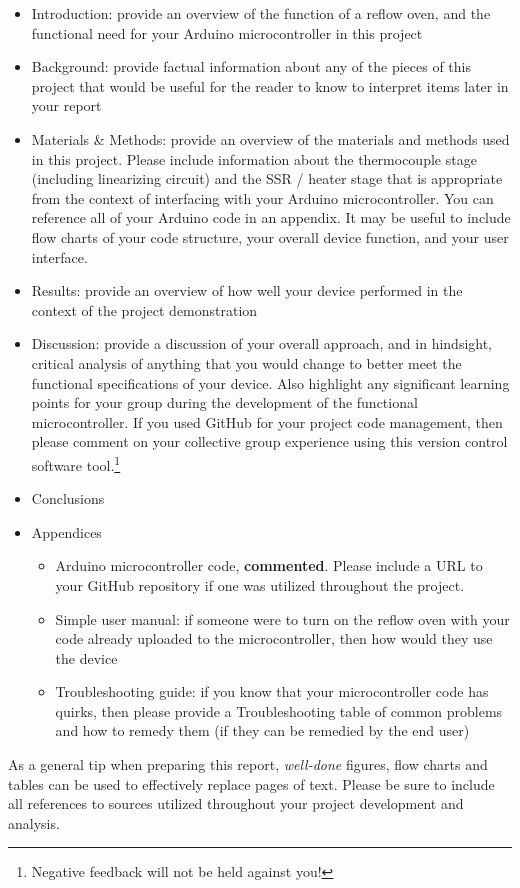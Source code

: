 \documentclass[10pt]{report}
\begin{document}
\begin{itemize}

  \item Introduction: provide an overview of the function of a reflow oven, and
    the functional need for your Arduino microcontroller in this project

  \item Background: provide factual information about any of the pieces of this
    project that would be useful for the reader to know to interpret items
    later in your report

  \item Materials \& Methods: provide an overview of the materials and methods
    used in this project.  Please include information about the thermocouple
    stage (including linearizing circuit) and the SSR / heater stage that is
    appropriate from the context of interfacing with your Arduino
    microcontroller.  You can reference all of your Arduino code in an
    appendix.  It may be useful to include flow charts of your code structure,
    your overall device function, and your user interface.

    \item Results: provide an overview of how well your device performed in the
      context of the project demonstration

    \item Discussion: provide a discussion of your overall approach, and in
      hindsight, critical analysis of anything that you would change to better
      meet the functional specifications of your device.  Also highlight any
      significant learning points for your group during the development of the
      functional microcontroller.  If you used GitHub for your project code
      management, then please comment on your collective group experience using
      this version control software tool.\footnote{Negative feedback will not
      be held against you!}

    \item Conclusions

    \item Appendices
      \begin{itemize}
            \item Arduino microcontroller code, {\bf commented}.  Please include a URL to your GitHub repository if one was utilized throughout the project.
            \item Simple user manual: if someone were to turn on the reflow
              oven with your code already uploaded to the microcontroller, then
              how would they use the device
            \item Troubleshooting guide: if you know that your microcontroller code has quirks, then please provide a Troubleshooting table of common problems and how to remedy them (if they can be remedied by the end user)
      \end{itemize}

\end{itemize}

As a general tip when preparing this report, \emph{well-done} figures, flow
charts and tables can be used to effectively replace pages of text.  Please be
sure to include all references to sources utilized throughout your project
development and analysis.
\end{document}
